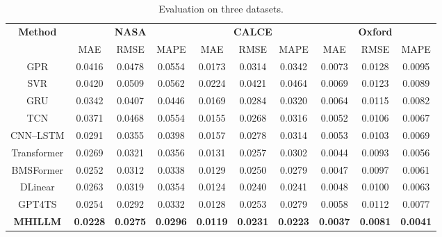 \documentclass[preprint,12pt]{elsarticle}
\begin{document}
\begin{table}[t]
\centering
\caption{Evaluation on three datasets.}
\label{tab:main_results}
\setlength{\tabcolsep}{0.1pt}
\renewcommand{\arraystretch}{1.18}

\begin{tabular}{c|ccc|ccc|ccc}
\hline
\multirow{2}{*}{\textbf{Method}}
& \multicolumn{3}{c|}{\textbf{NASA}}
& \multicolumn{3}{c|}{\textbf{CALCE}}
& \multicolumn{3}{c}{\textbf{Oxford}} \\

& {MAE} & {RMSE} & {MAPE}
& {MAE} & {RMSE} & {MAPE}
& {MAE} & {RMSE} & {MAPE} \\
\hline

GPR
& 0.0416 & 0.0478 & 0.0554
& 0.0173 & 0.0314 & 0.0342
& 0.0073 & 0.0128 & 0.0095 \\

SVR
& 0.0420 & 0.0509 & 0.0562
& 0.0224 & 0.0421 & 0.0464
& 0.0069 & 0.0123 & 0.0089 \\

GRU
& 0.0342 & 0.0407 & 0.0446
& 0.0169 & 0.0284 & 0.0320
& 0.0064 & 0.0115 & 0.0082 \\

TCN
& 0.0371 & 0.0468 & 0.0554
& 0.0155 & 0.0268 & 0.0316
& 0.0052 & 0.0106 & 0.0067 \\

CNN--LSTM
& 0.0291 & 0.0355 & 0.0398
& 0.0157 & 0.0278 & 0.0314
& 0.0053 & 0.0103 & 0.0069 \\

Transformer
& 0.0269 & 0.0321 & 0.0356
& 0.0131 & 0.0257 & 0.0302
& 0.0044 & 0.0093 & 0.0056 \\

BMSFormer
& 0.0252 & 0.0312 & 0.0338
& 0.0129 & 0.0250 & 0.0279
& 0.0047 & 0.0097 & 0.0061 \\

DLinear
& 0.0263 & 0.0319 & 0.0354
& 0.0124 & 0.0240 & 0.0241
& 0.0048 & 0.0100 & 0.0063 \\

GPT4TS
& 0.0254 & 0.0292 & 0.0332
& 0.0128 & 0.0253 & 0.0279
& 0.0058 & 0.0112 & 0.0077\\
\hline

\textbf{MHILLM}
& \textbf{0.0228} & \textbf{0.0275} & \textbf{0.0296}
& \textbf{0.0119} & \textbf{0.0231} & \textbf{0.0223}
& \textbf{0.0037} & \textbf{0.0081} & \textbf{0.0041} \\
\hline
\end{tabular}
\end{table}
\end{document}
